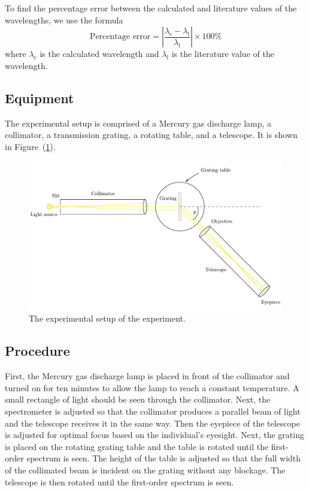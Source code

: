 \documentclass[10pt]{article}
\begin{document}
To find the percentage error between the calculated and literature values of the wavelengths, we use the formula
\begin{equation}
  \text{Percentage error} = \left| \frac{\lambda_{\text{c}} - \lambda_{\text{l}}}{\lambda_{\text{l}}} \right| \times 100 \%
\end{equation}
where $\lambda_{\text{c}}$ is the calculated wavelength and $\lambda_{\text{l}}$ is the literature value of the wavelength.

\subsection*{Equipment}

The experimental setup is comprised of a Mercury gas discharge lamp, a collimator, a transmission grating, a rotating table, and a telescope. It is shown in Figure~(\ref{fig:1}). 

\begin{figure}[hbt!]
  \centering
  \includegraphics[scale=0.6]{figures/f1.pdf}
  \caption{The experimental setup of the experiment.}
  \label{fig:1}
\end{figure}

\subsection*{Procedure}

First, the Mercury gas discharge lamp is placed in front of the collimator and turned on for ten minutes to allow the lamp to reach a constant temperature. A small rectangle of light should be seen through the collimator. Next, the spectrometer is adjusted so that the collimator produces a parallel beam of light and the telescope receives it in the same way. Then the eyepiece of the telescope is adjusted for optimal focus based on the individual's eyesight. Next, the grating is placed on the rotating grating table and the table is rotated until the first-order spectrum is seen. The height of the table is adjusted so that the full width of the collimated beam is incident on the grating without any blockage. The telescope is then rotated until the first-order spectrum is seen. 
\end{document}
